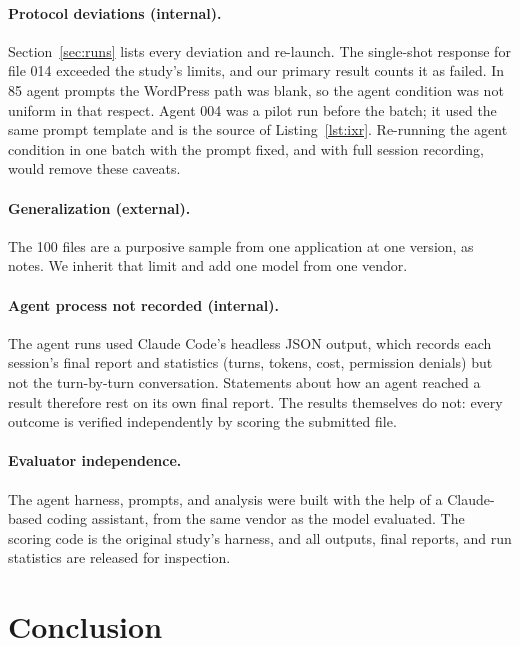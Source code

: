 \documentclass[11pt]{article}
\begin{document}
\paragraph{Protocol deviations (internal).}
Section~\ref{sec:runs} lists every deviation and re-launch.
The single-shot response for file 014 exceeded the study's limits, and our primary result counts it as failed.
In 85 agent prompts the WordPress path was blank, so the agent condition was not uniform in that respect.
Agent 004 was a pilot run before the batch; it used the same prompt template and is the source of Listing~\ref{lst:ixr}.
Re-running the agent condition in one batch with the prompt fixed, and with full session recording, would remove these caveats.

\paragraph{Generalization (external).}
The 100 files are a purposive sample from one application at one version, as~\cite{mahmud2026modernization} notes.
We inherit that limit and add one model from one vendor.

\paragraph{Agent process not recorded (internal).}
The agent runs used Claude Code's headless JSON output, which records each session's final report and statistics (turns, tokens, cost, permission denials) but not the turn-by-turn conversation.
Statements about how an agent reached a result therefore rest on its own final report.
The results themselves do not: every outcome is verified independently by scoring the submitted file.

\paragraph{Evaluator independence.}
The agent harness, prompts, and analysis were built with the help of a Claude-based coding assistant, from the same vendor as the model evaluated.
The scoring code is the original study's harness, and all outputs, final reports, and run statistics are released for inspection.

\section{Conclusion}
\end{document}
